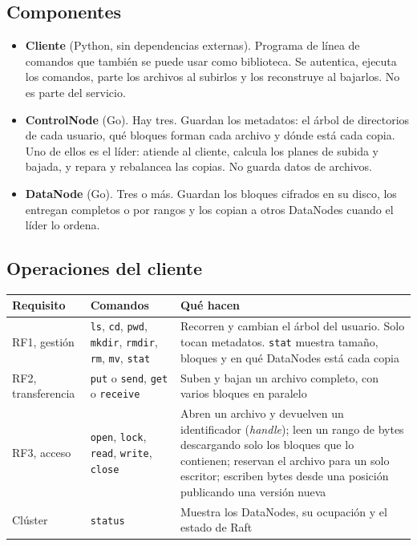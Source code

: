 \documentclass[10pt]{article}
\begin{document}
\subsection{Componentes}

\begin{itemize}
\item \textbf{Cliente} (Python, sin dependencias externas). Programa de línea de comandos que también se puede usar como biblioteca. Se autentica, ejecuta los comandos, parte los archivos al subirlos y los reconstruye al bajarlos. No es parte del servicio.
\item \textbf{ControlNode} (Go). Hay tres. Guardan los metadatos: el árbol de directorios de cada usuario, qué bloques forman cada archivo y dónde está cada copia. Uno de ellos es el líder: atiende al cliente, calcula los planes de subida y bajada, y repara y rebalancea las copias. No guarda datos de archivos.
\item \textbf{DataNode} (Go). Tres o más. Guardan los bloques cifrados en su disco, los entregan completos o por rangos y los copian a otros DataNodes cuando el líder lo ordena.
\end{itemize}

\subsection{Operaciones del cliente}

\begin{xltabular}{\linewidth}{@{}L{2.6cm}L{5.4cm}Y@{}}
\toprule
Requisito & Comandos & Qué hacen \\
\midrule\endhead
RF1, gestión & \texttt{ls}, \texttt{cd}, \texttt{pwd}, \texttt{mkdir}, \texttt{rmdir}, \texttt{rm}, \texttt{mv}, \texttt{stat} & Recorren y cambian el árbol del usuario. Solo tocan metadatos. \texttt{stat} muestra tamaño, bloques y en qué DataNodes está cada copia \\
RF2, transferencia & \texttt{put} o \texttt{send}, \texttt{get} o \texttt{receive} & Suben y bajan un archivo completo, con varios bloques en paralelo \\
RF3, acceso & \texttt{open}, \texttt{lock}, \texttt{read}, \texttt{write}, \texttt{close} & Abren un archivo y devuelven un identificador (\emph{handle}); leen un rango de bytes descargando solo los bloques que lo contienen; reservan el archivo para un solo escritor; escriben bytes desde una posición publicando una versión nueva \\
Clúster & \texttt{status} & Muestra los DataNodes, su ocupación y el estado de Raft \\
\bottomrule
\end{xltabular}
\end{document}
